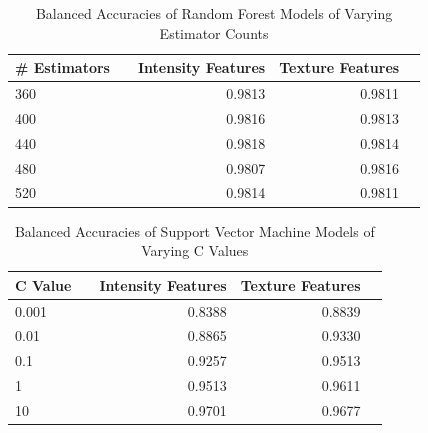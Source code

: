 \documentclass[12pt]{article}
\begin{document}
\begin{table}[H]
    \centering
    \begin{tabular}{llrrr}
        \toprule
        \# Estimators & & Intensity Features & Texture Features \\
        \midrule
        \textsc{360} & & 0.9813 & 0.9811 \\
        \textsc{400} & & 0.9816 & 0.9813 \\
        \textsc{440} & & 0.9818 & 0.9814 \\
        \textsc{480} & & 0.9807 & 0.9816 \\
        \textsc{520} & & 0.9814 & 0.9811 \\
        \bottomrule
    \end{tabular}
    \caption{\label{tab:rf_search_results} Balanced Accuracies of Random Forest Models of Varying Estimator Counts}
\end{table}
    
\begin{table}[H]
    \centering
    \begin{tabular}{llrrr}
        \toprule
        C Value & & Intensity Features & Texture Features \\
        \midrule
        \textsc{0.001} & & 0.8388 & 0.8839 \\
        \textsc{0.01}  & & 0.8865 & 0.9330 \\
        \textsc{0.1}   & & 0.9257 & 0.9513 \\
        \textsc{1}     & & 0.9513 & 0.9611 \\
        \textsc{10}    & & 0.9701 & 0.9677 \\
        \bottomrule
    \end{tabular}
    \caption{\label{tab:svm_search_results} Balanced Accuracies of Support Vector Machine Models of Varying C Values}
\end{table}
\end{document}

